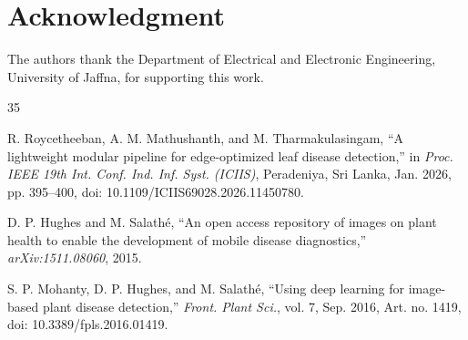 \documentclass[journal]{IEEEtran}
\begin{document}
\section*{Acknowledgment}
The authors thank the Department of Electrical and Electronic Engineering,
University of Jaffna, for supporting this work.

\begin{thebibliography}{35}

R. Roycetheeban, A. M. Mathushanth, and M. Tharmakulasingam, ``A lightweight modular
pipeline for edge-optimized leaf disease detection,'' in \emph{Proc. IEEE 19th Int.
Conf. Ind. Inf. Syst. (ICIIS)}, Peradeniya, Sri Lanka, Jan. 2026, pp. 395--400,
doi: 10.1109/ICIIS69028.2026.11450780.

D. P. Hughes and M. Salath\'e, ``An open access repository of images on plant health
to enable the development of mobile disease diagnostics,'' \emph{arXiv:1511.08060},
2015.

S. P. Mohanty, D. P. Hughes, and M. Salath\'e, ``Using deep learning for image-based
plant disease detection,'' \emph{Front. Plant Sci.}, vol. 7, Sep. 2016, Art. no. 1419,
doi: 10.3389/fpls.2016.01419.


\end{thebibliography}
\end{document}
